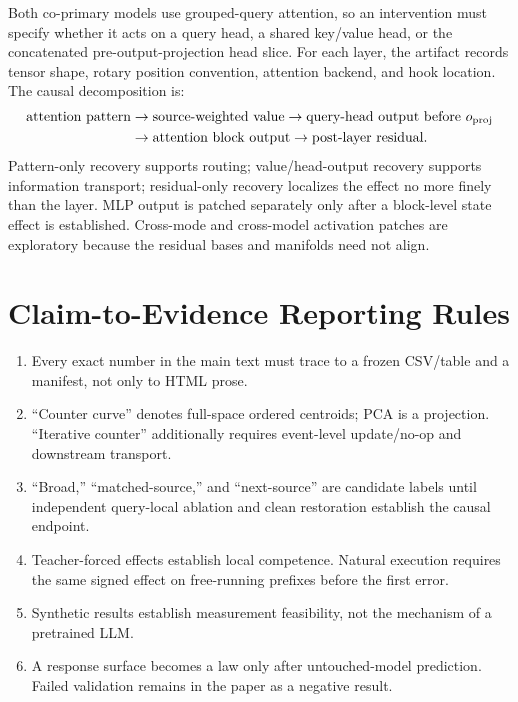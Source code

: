 Both co-primary models use grouped-query attention, so an intervention must specify whether it acts on a query head, a shared key/value head, or the concatenated pre-output-projection head slice. For each layer, the artifact records tensor shape, rotary position convention, attention backend, and hook location. The causal decomposition is:
\[
\begin{aligned}
\text{attention pattern}
&\rightarrow
\text{source-weighted value}
\rightarrow
\text{query-head output before }o_{\rm proj}\\
&\rightarrow
\text{attention block output}
\rightarrow
\text{post-layer residual}.
\end{aligned}
\]
Pattern-only recovery supports routing; value/head-output recovery supports information transport; residual-only recovery localizes the effect no more finely than the layer. MLP output is patched separately only after a block-level state effect is established. Cross-mode and cross-model activation patches are exploratory because the residual bases and manifolds need not align.

\section{Claim-to-Evidence Reporting Rules}
\label{app:rules}

\begin{enumerate}
  \item Every exact number in the main text must trace to a frozen CSV/table and a manifest, not only to HTML prose.
  \item ``Counter curve'' denotes full-space ordered centroids; PCA is a projection. ``Iterative counter'' additionally requires event-level update/no-op and downstream transport.
  \item ``Broad,'' ``matched-source,'' and ``next-source'' are candidate labels until independent query-local ablation and clean restoration establish the causal endpoint.
  \item Teacher-forced effects establish local competence. Natural execution requires the same signed effect on free-running prefixes before the first error.
  \item Synthetic results establish measurement feasibility, not the mechanism of a pretrained LLM.
  \item A response surface becomes a law only after untouched-model prediction. Failed validation remains in the paper as a negative result.
\end{enumerate}
